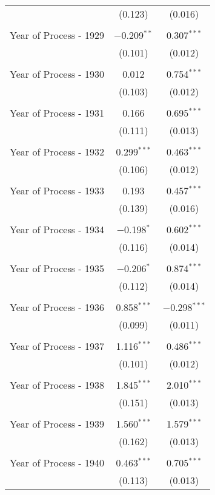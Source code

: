 \begin{table}[!htbp]
\begin{tabular}{@{\extracolsep{5pt}}lcc}
  & (0.123) & (0.016) \\ 
  & & \\ 
 Year of Process - 1929 & $-$0.209$^{**}$ & 0.307$^{***}$ \\ 
  & (0.101) & (0.012) \\ 
  & & \\ 
 Year of Process - 1930 & 0.012 & 0.754$^{***}$ \\ 
  & (0.103) & (0.012) \\ 
  & & \\ 
 Year of Process - 1931 & 0.166 & 0.695$^{***}$ \\ 
  & (0.111) & (0.013) \\ 
  & & \\ 
 Year of Process - 1932 & 0.299$^{***}$ & 0.463$^{***}$ \\ 
  & (0.106) & (0.012) \\ 
  & & \\ 
 Year of Process - 1933 & 0.193 & 0.457$^{***}$ \\ 
  & (0.139) & (0.016) \\ 
  & & \\ 
 Year of Process - 1934 & $-$0.198$^{*}$ & 0.602$^{***}$ \\ 
  & (0.116) & (0.014) \\ 
  & & \\ 
 Year of Process - 1935 & $-$0.206$^{*}$ & 0.874$^{***}$ \\ 
  & (0.112) & (0.014) \\ 
  & & \\ 
 Year of Process - 1936 & 0.858$^{***}$ & $-$0.298$^{***}$ \\ 
  & (0.099) & (0.011) \\ 
  & & \\ 
 Year of Process - 1937 & 1.116$^{***}$ & 0.486$^{***}$ \\ 
  & (0.101) & (0.012) \\ 
  & & \\ 
 Year of Process - 1938 & 1.845$^{***}$ & 2.010$^{***}$ \\ 
  & (0.151) & (0.013) \\ 
  & & \\ 
 Year of Process - 1939 & 1.560$^{***}$ & 1.579$^{***}$ \\ 
  & (0.162) & (0.013) \\ 
  & & \\ 
 Year of Process - 1940 & 0.463$^{***}$ & 0.705$^{***}$ \\ 
  & (0.113) & (0.013) \\ 

\end{tabular}
\end{table}
